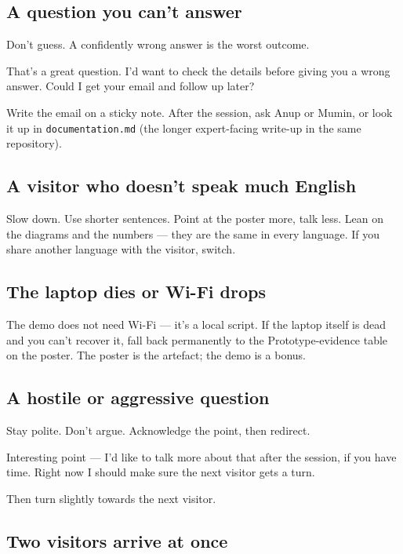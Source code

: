 \documentclass[a4paper,11pt]{article}
\begin{document}
\subsection*{A question you can't answer}

Don't guess. A confidently wrong answer is the worst outcome.

\begin{spoken}
That's a great question. I'd want to check the details before
giving you a wrong answer. Could I get your email and follow up
later?
\end{spoken}

Write the email on a sticky note. After the session, ask Anup or
Mumin, or look it up in \texttt{documentation.md} (the longer
expert-facing write-up in the same repository).

\subsection*{A visitor who doesn't speak much English}

Slow down. Use shorter sentences. Point at the poster more, talk
less. Lean on the diagrams and the numbers --- they are the same
in every language. If you share another language with the
visitor, switch.

\subsection*{The laptop dies or Wi-Fi drops}

The demo does not need Wi-Fi --- it's a local script. If the
laptop itself is dead and you can't recover it, fall back
permanently to the Prototype-evidence table on the poster. The
poster is the artefact; the demo is a bonus.

\subsection*{A hostile or aggressive question}

Stay polite. Don't argue. Acknowledge the point, then redirect.

\begin{spoken}
Interesting point --- I'd like to talk more about that after the
session, if you have time. Right now I should make sure the next
visitor gets a turn.
\end{spoken}

Then turn slightly towards the next visitor.

\subsection*{Two visitors arrive at once}
\end{document}
